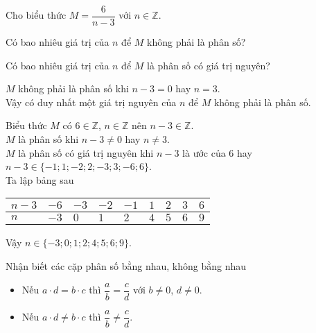 \begin{vd}%
 Cho biểu thức $M=\dfrac{6}{n-3}$ với $n\in\mathbb{Z}$.
 \begin{enumEX}{1}
  \item Có bao nhiêu giá trị của $n$ để $M$ không phải là phân số?
  \item Có bao nhiêu giá trị của $n$ để $M$ là phân số có giá trị nguyên?
 \end{enumEX}
 \loigiai
  {
  \begin{enumEX}{1}
   \item $M$ không phải là phân số khi $n-3=0$ hay $n=3$.\\
   Vậy có duy nhất một giá trị nguyên của $n$ để $M$ không phải là phân số.
   \item Biểu thức $M$ có $6\in\mathbb{Z}$, $n\in\mathbb{Z}$ nên $n-3\in\mathbb{Z}$.\\
   $M$ là phân số khi $n-3\neq 0$ hay $n\neq 3$.\\
   $M$ là phân số có giá trị nguyên khi $n-3$ là ước của $6$ hay $n-3 \in \{-1;1;-2;2;-3;3;-6;6\}$.\\
   Ta lập bảng sau
   \begin{center}
   	\begin{tabular}{|>{\centering\arraybackslash}m{1cm}|>{\centering\arraybackslash}m{1cm}|>{\centering\arraybackslash}m{1cm}|>{\centering\arraybackslash}m{1cm}|>{\centering\arraybackslash}m{1cm}|>{\centering\arraybackslash}m{1cm}|>{\centering\arraybackslash}m{1cm}|>{\centering\arraybackslash}m{1cm}|>{\centering\arraybackslash}m{1cm}|}
   	 \hline
   	 $n-3$ & $-6$ & $-3$ & $-2$ & $-1$ & $1$ & $2$ & $3$ & $6$ \\ \hline
   	 $n$ & $-3$ & $0$ & $1$ & $2$ & $4$ & $5$ & $6$ & $9$\\ \hline
   	\end{tabular}
   \end{center}
   Vậy $n\in\{-3;0;1;2;4;5;6;9\}$.
  \end{enumEX}
  }
\end{vd}

\begin{dang}{Nhận biết các cặp phân số bằng nhau, không bằng nhau}
 \begin{itemize}
  \item Nếu $a \cdot d = b \cdot c$ thì $\dfrac{a}{b}=\dfrac{c}{d}$ với $b\neq 0$, $d\neq 0$.
  \item Nếu $a \cdot d \neq b \cdot c$ thì $\dfrac{a}{b}\neq\dfrac{c}{d}$.
 \end{itemize}
\end{dang}

